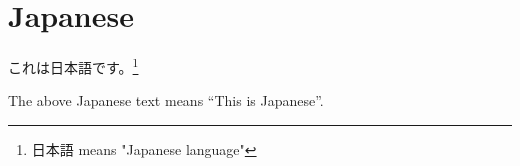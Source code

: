 \documentclass[letterpaper, 12pt]{article}
\newcommand{\q}[1]{``#1''} %
\begin{document}
\section{Japanese}
\begin{center}
        これは日本語です。\footnote{日本語 means "Japanese language"}
\end{center}
The above Japanese text means \q{This is Japanese}.
\end{document}
